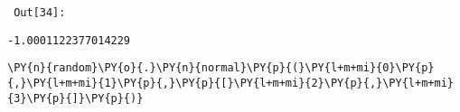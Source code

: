         {\par%
        \vspace{-1\smallerfontscale}%
        \noindent%
        \begin{minipage}{\cellleftmargin}%
    \hfill%
    {\smaller%
    \tt%
    \color{nbframe-out-prompt}%
    Out[34]:}%
    \hspace{\inputpadding}%
    \hspace{0em}%
    \hspace{3pt}%
    \end{minipage}%
        }%
    \begin{addmargin}[\cellleftmargin]{0em}%
    {\smaller%
    \vspace{-1\smallerfontscale}%
    
    
    
    \begin{verbatim}
-1.0001122377014229
    \end{verbatim}

    
}%
    \end{addmargin}%

{\par%
\vspace{-1\baselineskip}%
}%
\begin{notebookcell}[35]%
\begin{addmargin}[\cellleftmargin]{0em}%
{\smaller%
\par%
%
\vspace{-1\smallerfontscale}%
\begin{Verbatim}[commandchars=\\\{\}]
\PY{n}{random}\PY{o}{.}\PY{n}{normal}\PY{p}{(}\PY{l+m+mi}{0}\PY{p}{,}\PY{l+m+mi}{1}\PY{p}{,}\PY{p}{[}\PY{l+m+mi}{2}\PY{p}{,}\PY{l+m+mi}{3}\PY{p}{]}\PY{p}{)}
\end{Verbatim}
%
\par%
\vspace{-1\smallerfontscale}}%
\end{addmargin}
\end{notebookcell}

\par\vspace{1\smallerfontscale}%
    
